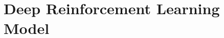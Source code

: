 \documentclass[12pt, a4paper, oneside]{book}
\begin{document}










\part{Deep Reinforcement Learning Model}







\end{document}
